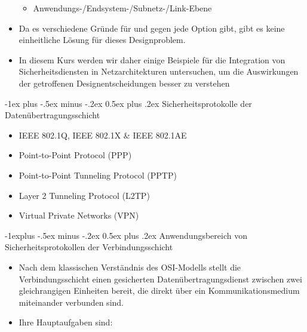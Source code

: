 \documentclass[a4paper]{article}
\makeatletter
\renewcommand{\section}{\@startsection{section}{1}{0mm}%
 {-1ex plus -.5ex minus -.2ex}%
 {0.5ex plus .2ex}%
 {\normalfont\large\bfseries}}
\renewcommand{\subsection}{\@startsection{subsection}{2}{0mm}%
 {-1explus -.5ex minus -.2ex}%
 {0.5ex plus .2ex}%
 {\normalfont\normalsize\bfseries}}
\makeatother
\begin{document}
\begin{multicols}{3}
\begin{itemize}
              \begin{itemize}
                  \item
                        Anwendungs-/Endsystem-/Subnetz-/Link-Ebene
              \end{itemize}
        \item
              Da es verschiedene Gründe für und gegen jede Option gibt, gibt es
              keine einheitliche Lösung für dieses Designproblem.
        \item
              In diesem Kurs werden wir daher einige Beispiele für die Integration
              von Sicherheitsdiensten in Netzarchitekturen untersuchen, um die
              Auswirkungen der getroffenen Designentscheidungen besser zu verstehen
    \end{itemize}


    \section{Sicherheitsprotokolle der
      Datenübertragungsschicht}

    \begin{itemize}
        \item
              IEEE 802.1Q, IEEE 802.1X \& IEEE 802.1AE
        \item
              Point-to-Point Protocol (PPP)
        \item
              Point-to-Point Tunneling Protocol (PPTP)
        \item
              Layer 2 Tunneling Protocol (L2TP)
        \item
              Virtual Private Networks (VPN)
    \end{itemize}


    \subsection{Anwendungsbereich von Sicherheitsprotokollen der
        Verbindungsschicht}

    \begin{itemize}
        \item
              Nach dem klassischen Verständnis des OSI-Modells stellt die
              Verbindungsschicht einen gesicherten Datenübertragungsdienst zwischen
              zwei gleichrangigen Einheiten bereit, die direkt über ein
              Kommunikationsmedium miteinander verbunden sind.
        \item
              Ihre Hauptaufgaben sind:


\end{itemize}
\end{multicols}
\end{document}
